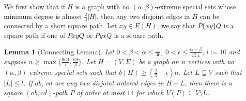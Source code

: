 \documentclass[oneside,12pt]{memoir}
\newtheorem{lemma}[theorem]{Lemma}
\newcommand{\ep}{\epsilon}
\begin{document}
We first show that if $H$ is a graph with no $(\alpha,\beta)$-extreme special
sets whose minimum degree is almost $\frac{2}{3}|H|$, then any two
disjoint edges in $H$ can be connected by a short square path.  Let $xy\in E(H)$; we say that $P\{xy\}Q$ is a square path if one of $PxyQ$ or $PyxQ$ is a square path.

\begin{lemma}
[Connecting Lemma] \label{connecting} Let $0<\beta<\alpha\leq\frac{1}{36}$,
$0<\ep\leq\frac{\alpha-\beta}{15.1}$, $l:=10$ and suppose $n\geq\max\{\frac{660}{\ep},\frac{69}{\beta}\}$.
Let $H=(V,E)$ be a graph on $n$ vertices with no $(\alpha,\beta)$-extreme
special sets such that $\delta(H)\geq(\frac{2}{3}-\ep)n$. Let $L\subseteq V$
such that $|L|\leq l$. If $ab$, $cd$ are any two disjoint
ordered edges in $H-L$, then there is a square $(ab, cd)$-path $P$
of order at most $14$ for which $V(P)\subseteq V\setminus L$. \end{lemma}
\end{document}
